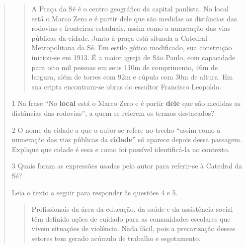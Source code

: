\begin{quote}
\begin{quote}

A Praça da Sé é o centro geográfico da capital paulista. No local está o Marco Zero 
e é partir dele que são medidas as distâncias das rodovias e fronteiras estaduais, 
assim como a numeração das vias públicas da cidade. Junto à praça está situada a 
Catedral Metropolitana da Sé. Em estilo gótico modificado, sua construção iniciou-se em 1913.
É a maior igreja de São Paulo, com capacidade para oito mil pessoas em seus 110m de comprimento, 
46m de largura, além de torres com 92m e cúpula com 30m de altura. Em sua cripta encontram-se
obras do escultor Francisco Leopoldo.

\end{quote}


\num{1} Na frase ``No \textbf{local} está o Marco Zero e é partir \textbf{dele} que são medidas
as distâncias das rodovias'', a quem se referem os termos destacados?


\num{2} O nome da cidade a que o autor se refere no trecho ``assim como a numeração das vias 
públicas da \textbf{cidade}'' só aparece depois dessa passagem. Explique que cidade é essa e
como foi possível identificá-la no contexto.


\num{3} Quais foram as expressões usadas pelo autor para referir-se à Catedral da Sé?


Leia o texto a seguir para responder às questões 4 e 5.

\begin{quote}

Profissionais da área da educação, da saúde e da assistência social têm
definido ações de cuidado para as comunidades escolares que vivem
situações de violência. Nada fácil, pois a precarização desses setores
tem gerado acúmulo de trabalho e esgotamento.


\end{quote}
\end{quote}
